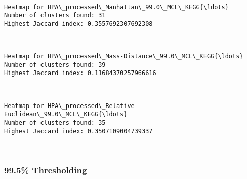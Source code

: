 \documentclass[11pt]{article}
\begin{document}
    \begin{center}
    \end{center}
    { \hspace*{\fill} \\}
    
    \begin{Verbatim}[commandchars=\\\{\}]
Heatmap for HPA\_processed\_Manhattan\_99.0\_MCL\_KEGG{\ldots}
Number of clusters found: 31
Highest Jaccard index: 0.3557692307692308

    \end{Verbatim}

    \begin{center}
    \end{center}
    { \hspace*{\fill} \\}
    
    \begin{Verbatim}[commandchars=\\\{\}]
Heatmap for HPA\_processed\_Mass-Distance\_99.0\_MCL\_KEGG{\ldots}
Number of clusters found: 39
Highest Jaccard index: 0.11684370257966616

    \end{Verbatim}

    \begin{center}
    \end{center}
    { \hspace*{\fill} \\}
    
    \begin{Verbatim}[commandchars=\\\{\}]
Heatmap for HPA\_processed\_Relative-Euclidean\_99.0\_MCL\_KEGG{\ldots}
Number of clusters found: 35
Highest Jaccard index: 0.3507109004739337

    \end{Verbatim}

    \begin{center}
    \end{center}
    { \hspace*{\fill} \\}
    
    \hypertarget{thresholding}{%
\subsubsection{99.5\% Thresholding}\label{thresholding}}
\end{document}
